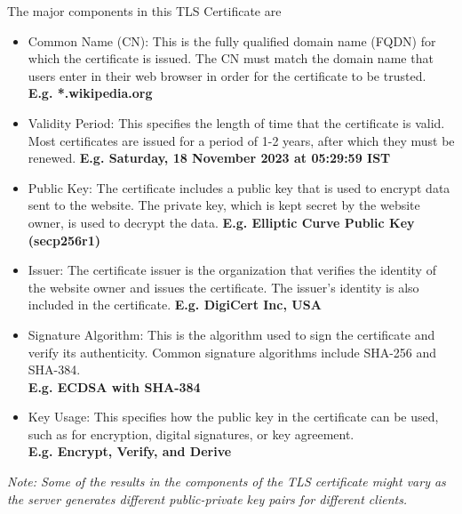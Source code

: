 \noindent The major components in this TLS Certificate are
\begin{itemize}
    \itemsep0em
    \item Common Name (CN): This is the fully qualified domain name (FQDN) for which the certificate is issued. The CN must match the domain name that users enter in their web browser in order for the certificate to be trusted.\\ \textbf{E.g. *.wikipedia.org}
    \item Validity Period: This specifies the length of time that the certificate is valid. Most certificates are issued for a period of 1-2 years, after which they must be renewed. \textbf{E.g. Saturday, 18 November 2023 at 05:29:59 IST}
    \item Public Key: The certificate includes a public key that is used to encrypt data sent to the website. The private key, which is kept secret by the website owner, is used to decrypt the data. \textbf{E.g. Elliptic Curve Public Key (secp256r1)}
    \item Issuer: The certificate issuer is the organization that verifies the identity of the website owner and issues the certificate. The issuer's identity is also included in the certificate. \textbf{E.g. DigiCert Inc, USA}
    \item Signature Algorithm: This is the algorithm used to sign the certificate and verify its authenticity. Common signature algorithms include SHA-256 and SHA-384.\\ \textbf{E.g. ECDSA with SHA-384}
    \item Key Usage: This specifies how the public key in the certificate can be used, such as for encryption, digital signatures, or key agreement. \\ \textbf{E.g. Encrypt, Verify, and Derive}
\end{itemize}

\noindent \textit{Note: Some of the results in the components of the TLS certificate might vary as the server generates different public-private key pairs for different clients.}

